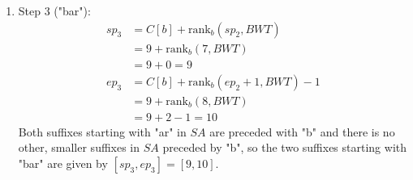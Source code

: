 \begin{Example}
\begin{enumerate}
    \item Step 3 ("{\color{red}bar}"):
    \begin{align*}
      sp_3 &= C[b] + \mathrm{rank}_b(sp_2, BWT) \\
           &= 9 + \mathrm{rank}_b(7, BWT) \\
           &= 9 + 0 = 9 \\
      ep_3 &= C[b] + \mathrm{rank}_b(ep_2 + 1, BWT) - 1 \\
           &= 9 + \mathrm{rank}_b(8, BWT) \\
           &= 9 + 2 - 1 = 10
    \end{align*}
    Both suffixes starting with "ar" in $SA$ are preceded with "b" and there is no other, smaller suffixes in $SA$ preceded by "b", so the two suffixes starting with "bar" are given by $[sp_3,ep_3]=[9,10]$.
  \end{enumerate}
\end{Example}
